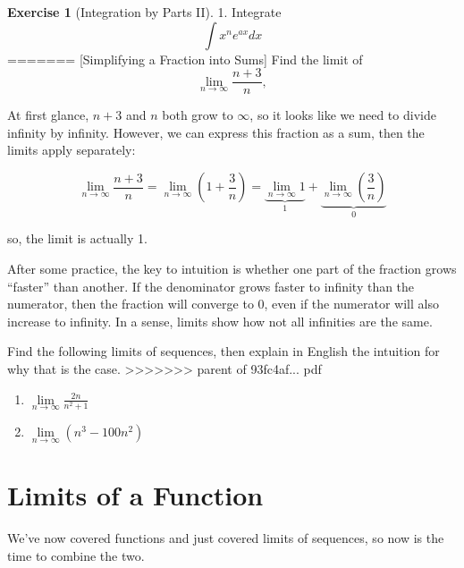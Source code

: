 \documentclass[]{book}
\providecommand{\tightlist}{%
  \setlength{\itemsep}{0pt}\setlength{\parskip}{0pt}}
\theoremstyle{definition}
\theoremstyle{definition}
\theoremstyle{definition}
\newtheorem{exercise}{Exercise}[chapter]
\theoremstyle{remark}
\begin{document}
\begin{exercise}[Integration by Parts II]
\protect\hypertarget{exr:intparts-adv}{}{\label{exr:intparts-adv} {} }
1. Integrate
\[\int x^n e^{ax} dx\]
=======
[Simplifying a Fraction into Sums]
\protect\hypertarget{exm:unnamed-chunk-3}{}{\label{exm:unnamed-chunk-3} {} }Find the limit of
\[\lim_{n\to \infty} \frac{n + 3}{n},\]

{}At first glance, \(n + 3\) and \(n\) both grow to \(\infty\), so it looks like we need to divide infinity by infinity. However, we can express this fraction as a sum, then the limits apply separately:

\[\lim_{n\to \infty} \frac{n + 3}{n} = \lim_{n\to \infty} \left(1 + \frac{3}{n}\right) =  \underbrace{\lim_{n\to \infty}1}_{1} +  \underbrace{\lim_{n\to \infty}\left(\frac{3}{n}\right)}_{0}\]

so, the limit is actually 1.

After some practice, the key to intuition is whether one part of the fraction grows ``faster'' than another. If the denominator grows faster to infinity than the numerator, then the fraction will converge to 0, even if the numerator will also increase to infinity. In a sense, limits show how not all infinities are the same.

\protect\hypertarget{exr:limseq2}{}{\label{exr:limseq2} }Find the following limits of sequences, then explain in English the intuition for why that is the case.
>>>>>>> parent of 93fc4af... pdf

\begin{enumerate}
\def\labelenumi{\arabic{enumi}.}
\tightlist
\item
  \(\lim\limits_{n\to\infty} \frac{2n}{n^2 + 1}\)
\item
  \(\lim\limits_{n\to\infty} (n^3 - 100n^2)\)
\end{enumerate}
\end{exercise}

\hypertarget{limitsfun}{%
\section{Limits of a Function}\label{limitsfun}}

We've now covered functions and just covered limits of sequences, so now is the time to combine the two.
\end{document}
